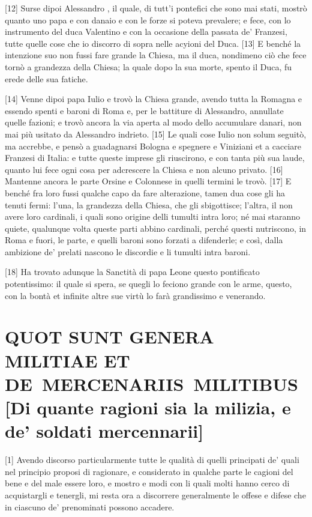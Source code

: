 {[}12{]} Surse dipoi Alessandro , il quale, di tutt'i pontefici che
sono mai stati, mostrò quanto uno papa e con danaio e con le forze si
poteva prevalere; e fece, con lo instrumento del duca Valentino e con la
occasione della passata de' Franzesi, tutte quelle cose che io discorro
di sopra nelle acyioni del Duca. {[}13{]} E benché la intenzione suo non
fussi fare grande la Chiesa, ma il duca, nondimeno ciò che fece tornò a
grandezza della Chiesa; la quale dopo la sua morte, spento il Duca, fu
erede delle sua fatiche.

{[}14{]} Venne dipoi papa Iulio e trovò la Chiesa grande, avendo tutta
la Romagna e essendo spenti e baroni di Roma e, per le battiture di
Alessandro, annullate quelle fazioni; e trovò ancora la via aperta al
modo dello accumulare danari, non mai più usitato da Alessandro
indrieto. {[}15{]} Le quali cose Iulio non solum seguitò, ma accrebbe, e
pensò a guadagnarsi Bologna e spegnere e Viniziani et a cacciare
Franzesi di Italia: e tutte queste imprese gli riuscirono, e con tanta
più sua laude, quanto lui fece ogni cosa per adcrescere la Chiesa e non
alcuno privato. {[}16{]} Mantenne ancora le parte Orsine e Colonnese in
quelli termini le trovò. {[}17{]} E benché fra loro fussi qualche capo
da fare alterazione, tamen dua cose gli ha tenuti fermi: l'una, la
grandezza della Chiesa, che gli sbigottisce; l'altra, il non avere loro
cardinali, i quali sono origine delli tumulti intra loro; né mai
staranno quiete, qualunque volta queste parti abbino cardinali, perché
questi nutriscono, in Roma e fuori, le parte, e quelli baroni sono
forzati a difenderle; e così, dalla ambizione de' prelati nascono le
discordie e li tumulti intra baroni.

\quebra

{[}18{]} Ha trovato adunque la
Sanctità di papa Leone questo pontificato potentissimo: il quale si
spera, se quegli lo feciono grande con le arme, questo, con la bontà et
infinite altre sue virtù lo farà grandissimo e venerando.

\quebra\section{QUOT SUNT GENERA MILITIAE ET DE~MERCENARIIS~MILITIBUS\break
{[}Di quante ragioni sia la milizia, e de' soldati mercennarii{]}}

{[}1{]} Avendo discorso particularmente tutte le qualità di quelli
principati de' quali nel principio proposi di ragionare, e considerato
in qualche parte le cagioni del bene e del male essere loro, e mostro e
modi con li quali molti hanno cerco di acquistargli e tenergli, mi resta
ora a discorrere generalmente le offese e difese che in ciascuno de'
prenominati possono accadere.

